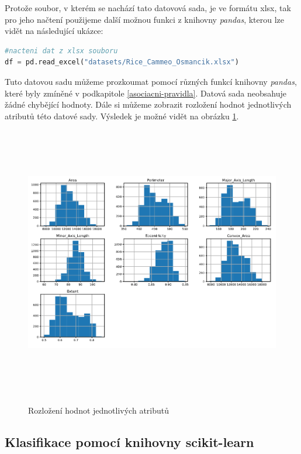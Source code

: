 Protože soubor, v kterém se nachází tato datovová sada, je ve formátu xlsx, tak pro jeho načtení použijeme další možnou funkci z knihovny \textit{pandas}, kterou lze vidět na následující ukázce: 

\begin{mdframed}
\begin{lstlisting}[language=Python]
#nacteni dat z xlsx souboru
df = pd.read_excel("datasets/Rice_Cammeo_Osmancik.xlsx")
\end{lstlisting}   
\end{mdframed}

Tuto datovou sadu můžeme prozkoumat pomocí různých funkcí knihovny \textit{pandas}, které byly zmíněné v podkapitole \ref{asociacni-pravidla}. Datová sada neobsahuje žádné chybějící hodnoty. Dále si můžeme zobrazit rozložení hodnot jednotlivých atributů této datové sady. Výsledek je možné vidět na obrázku \ref{hodnoty-klasifikace}.

\begin{figure}[h]\centering
  \centering
  \includegraphics[width=\linewidth,height=4.7in]{obrazky/hodnoty-klasifikace.pdf}\\[1pt]
  \caption{Rozložení hodnot jednotlivých atributů}
  \label{hodnoty-klasifikace}
\end{figure}

\subsection*{Klasifikace pomocí knihovny scikit-learn}

